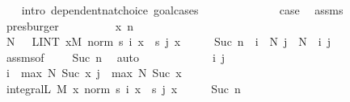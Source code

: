 \begin{isabellebody}
\ \ \isamarkupfalse%
\ {\isacharparenleft}{\kern0pt}intro\ dependent{\isacharunderscore}{\kern0pt}nat{\isacharunderscore}{\kern0pt}choice{\isacharcomma}{\kern0pt}\ goal{\isacharunderscore}{\kern0pt}cases{\isacharparenright}{\kern0pt}\isanewline
\ \ \ \ \isamarkupfalse%
\ {}\isanewline
\ \ \ \ \isamarkupfalse%
\ \isamarkupfalse%
\ {\isacharquery}{\kern0pt}case\ \isamarkupfalse%
\ assms{\isacharparenleft}{\kern0pt}{}{\isacharparenright}{\kern0pt}\ \isamarkupfalse%
\ presburger\isanewline
\ \ \isamarkupfalse%
\isanewline
\ \ \ \ \isamarkupfalse%
\ {\isacharparenleft}{\kern0pt}{}\ x\ n{\isacharparenright}{\kern0pt}\isanewline
\ \ \ \ \isamarkupfalse%
\ N\ \ {\isacharasterisk}{\kern0pt}{\isacharcolon}{\kern0pt}\ {\isachardoublequoteopen}LINT\ x{\isacharbar}{\kern0pt}M{\isachardot}{\kern0pt}\ norm\ {\isacharparenleft}{\kern0pt}s\ i\ x\ {\isacharminus}{\kern0pt}\ s\ j\ x{\isacharparenright}{\kern0pt}\ {\isacharless}{\kern0pt}\ {\isacharparenleft}{\kern0pt}{}\ {\isacharslash}{\kern0pt}\ {}{\isacharparenright}{\kern0pt}\ {\isacharcircum}{\kern0pt}\ Suc\ n{\isachardoublequoteclose}\ \ {\isachardoublequoteopen}i\ {\isasymge}\ N{\isachardoublequoteclose}\ {\isachardoublequoteopen}j\ {\isasymge}\ N{\isachardoublequoteclose}\ \ i\ j\ \isamarkupfalse%
\ assms{\isacharparenleft}{\kern0pt}{}{\isacharparenright}{\kern0pt}{\isacharbrackleft}{\kern0pt}of\ {\isachardoublequoteopen}{\isacharparenleft}{\kern0pt}{}\ {\isacharslash}{\kern0pt}\ {}{\isacharparenright}{\kern0pt}\ {\isacharcircum}{\kern0pt}\ Suc\ n{\isachardoublequoteclose}{\isacharbrackright}{\kern0pt}\ \isamarkupfalse%
\ auto\isanewline
\ \ \ \ \isacommand{{\isacharbraceleft}{\kern0pt}}\isamarkupfalse%
\isanewline
\ \ \ \ \ \ \isamarkupfalse%
\ i\ j\ \isamarkupfalse%
\ {\isachardoublequoteopen}i\ {\isasymge}\ max\ N\ {\isacharparenleft}{\kern0pt}Suc\ x{\isacharparenright}{\kern0pt}{\isachardoublequoteclose}\ {\isachardoublequoteopen}j\ {\isasymge}\ max\ N\ {\isacharparenleft}{\kern0pt}Suc\ x{\isacharparenright}{\kern0pt}{\isachardoublequoteclose}\isanewline
\ \ \ \ \ \ \isamarkupfalse%
\ {\isachardoublequoteopen}integral\isactrlsup L\ M\ {\isacharparenleft}{\kern0pt}{\isasymlambda}x{\isachardot}{\kern0pt}\ norm\ {\isacharparenleft}{\kern0pt}s\ i\ x\ {\isacharminus}{\kern0pt}\ s\ j\ x{\isacharparenright}{\kern0pt}{\isacharparenright}{\kern0pt}\ {\isacharless}{\kern0pt}\ {\isacharparenleft}{\kern0pt}{}\ {\isacharslash}{\kern0pt}\ {}{\isacharparenright}{\kern0pt}\ {\isacharcircum}{\kern0pt}\ Suc\ n{\isachardoublequoteclose}\ \isamarkupfalse%

\end{isabellebody}
